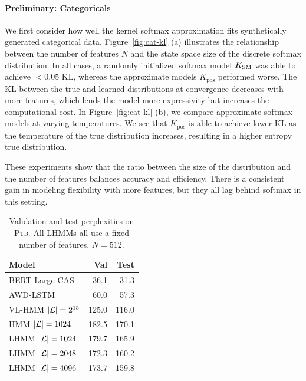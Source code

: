 \documentclass{article}
\begin{document}
\paragraph{Preliminary: Categoricals}
We first consider how well the kernel softmax approximation 
fits synthetically generated categorical data.
Figure~\ref{fig:cat-kl} (a) illustrates the relationship between the number of features $N$ and the state space size of the discrete softmax distribution. In all cases, a randomly initialized softmax model $K_{\mathrm{SM}}$ was able to achieve $< 0.05$ KL, whereas the approximate models $K_{\textrm{pos}}$ performed worse. The KL between the true and learned distributions at convergence decreases with more features, which lends the model more expressivity but increases the computational cost.
In Figure~\ref{fig:cat-kl} (b), we compare approximate softmax models at varying temperatures. We see that $K_{\textrm{pos}}$ is able to achieve lower KL as the temperature of the true distribution increases, resulting in a higher entropy true distribution.

These experiments show that the ratio between the size of the distribution and the number of features balances accuracy and efficiency. There is a consistent gain in modeling flexibility with more features, but they all lag 
behind softmax in this setting.

\begin{table}[!t]
\centering
\begin{tabular}{lrr}
\toprule
Model & Val & Test\\
\midrule
BERT-Large-CAS & 36.1 & 31.3\\
AWD-LSTM & 60.0 & 57.3\\
VL-HMM $|\mathcal{L}|=2^{15}$ & 125.0 & 116.0\\
HMM $|\mathcal{L}|=1024$ & 182.5 & 170.1\\
LHMM $|\mathcal{L}|=1024$ & 179.7 & 165.9\\
LHMM $|\mathcal{L}|=2048$ & 172.3 & 160.2\\
LHMM $|\mathcal{L}|=4096$ & 173.7 & 159.8\\
\bottomrule
\end{tabular}
\caption{\label{tbl:hmm-ppl}
Validation and test perplexities on \textsc{Ptb}.
All LHMMs all use a fixed number of features, $N = 512$.
}
\end{table}
\end{document}

